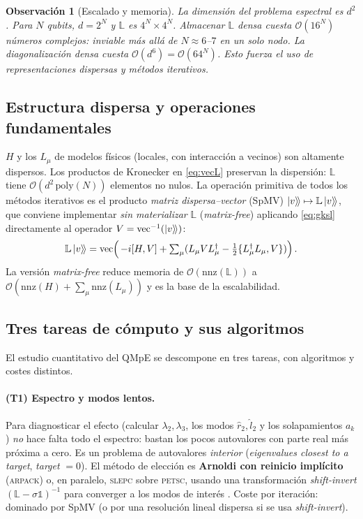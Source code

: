 \documentclass[11pt,a4paper]{article}
\theoremstyle{definition}
\theoremstyle{plain}
\newtheorem{observacion}{Observación}[section]
\newcommand{\vecop}[1]{\operatorname{vec}\!\left(#1\right)}
\begin{document}
\begin{observacion}[Escalado y memoria]
La dimensión del problema espectral es $d^2$. Para $N$ qubits, $d=2^N$ y $\mathbb{L}$ es $4^N\times4^N$.
Almacenar $\mathbb{L}$ \emph{densa} cuesta $\mathcal{O}(16^N)$ números complejos: inviable más allá de
$N\!\approx\!6$--$7$ en un solo nodo. La diagonalización densa cuesta $\mathcal{O}(d^6)=\mathcal{O}(64^N)$.
Esto fuerza el uso de representaciones \emph{dispersas} y métodos iterativos.
\end{observacion}

\subsection{Estructura dispersa y operaciones fundamentales}

$H$ y los $L_\mu$ de modelos físicos (locales, con interacción a vecinos) son altamente dispersos. Los
productos de Kronecker en \eqref{eq:vecL} preservan la dispersión: $\mathbb{L}$ tiene
$\mathcal{O}(d^2\,\mathrm{poly}(N))$ elementos no nulos. La operación primitiva de todos los métodos
iterativos es el producto \emph{matriz dispersa--vector} (SpMV) $\ket{v}\!\rangle\mapsto\mathbb{L}\ket{v}\!\rangle$,
que conviene implementar \emph{sin materializar} $\mathbb{L}$ (\emph{matrix-free}) aplicando
\eqref{eq:gksl} directamente al operador $V=\operatorname{vec}^{-1}(\ket{v}\!\rangle)$:
\begin{equation}
\mathbb{L}\ket{v}\!\rangle=\vecop{\,-i[H,V]+\textstyle\sum_\mu(L_\mu V L_\mu^{\dagger}-\tfrac12\{L_\mu^{\dagger}L_\mu,V\})}.
\end{equation}
La versión \emph{matrix-free} reduce memoria de $\mathcal{O}(\mathrm{nnz}(\mathbb{L}))$ a
$\mathcal{O}(\mathrm{nnz}(H)+\sum_\mu\mathrm{nnz}(L_\mu))$ y es la base de la escalabilidad.

\subsection{Tres tareas de cómputo y sus algoritmos}

El estudio cuantitativo del QMpE se descompone en tres tareas, con algoritmos y costes distintos.

\paragraph{(T1) Espectro y modos lentos.}
Para diagnosticar el efecto (calcular $\lambda_2,\lambda_3$, los modos $\hat r_2,\hat l_2$ y los
solapamientos $a_k$) \emph{no} hace falta todo el espectro: bastan los pocos autovalores con parte real más
próxima a cero. Es un problema de autovalores \emph{interior} (\emph{eigenvalues closest to a target},
\emph{target} $=0$). El método de elección es \textbf{Arnoldi con reinicio implícito}
(\textsc{arpack}) o, en paralelo, \textsc{slepc} sobre \textsc{petsc}, usando una transformación
\emph{shift-invert} $(\mathbb{L}-\sigma\mathbb{1})^{-1}$ para converger a los modos de interés
\cite{Lehoucq1998,Hernandez2005,Balay2023,Minganti2018}. Coste por iteración: dominado por SpMV (o por una
resolución lineal dispersa si se usa \emph{shift-invert}).
\end{document}

